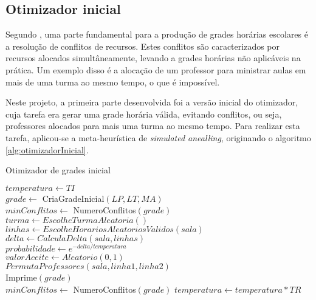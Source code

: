 \subsection{Otimizador inicial}

Segundo , uma parte fundamental para a produção de grades horárias escolares é a resolução de conflitos de recursos. Estes conflitos são caracterizados por recursos alocados simultâneamente, levando a grades horárias não aplicáveis na prática. Um exemplo disso é a alocação de um professor para ministrar aulas em mais de uma turma ao mesmo tempo, o que é impossível.

Neste projeto, a primeira parte desenvolvida foi a versão inicial do otimizador, cuja tarefa era gerar uma grade horária válida, evitando conflitos, ou seja, professores alocados para mais uma turma ao mesmo tempo. Para realizar esta tarefa, aplicou-se a meta-heurística de \textit{simulated anealling}, originando o algoritmo \ref{alg:otimizadorInicial}.

\begin{algorithm}
	\caption{Otimizador de grades inicial}
	\label{alg:otimizadorInicial}
	$temperatura \leftarrow TI$\\
	$grade \leftarrow$ CriaGradeInicial$(LP, LT, MA)$\\
	$minConflitos \leftarrow$ NumeroConflitos$(grade)$\\
	 {
		 {
			$turma \leftarrow EscolheTurmaAleatoria()$\\
			$linhas \leftarrow EscolheHorariosAleatoriosValidos(sala)$\\
			$delta \leftarrow CalculaDelta(sala, linhas)$\\
			$probabilidade \leftarrow e^{-delta/temperatura}$\\
			$valorAceite \leftarrow Aleatorio(0, 1)$\\
			 {
				$PermutaProfessores(sala, linha1, linha2)$\\
				 {
					Imprime$(grade)$\\
					$minConflitos \leftarrow$ NumeroConflitos$(grade)$
				}
			}
		}
		$temperatura \leftarrow temperatura * TR$
	}
\end{algorithm}

